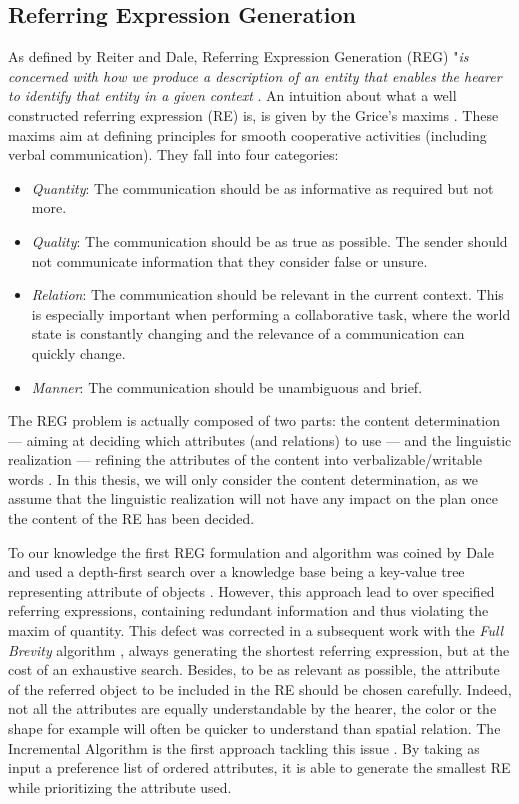 \documentclass[a4paper,11pt,twoside]{StyleThese}
\begin{document}
\subsection{Referring Expression Generation}
As defined by Reiter and Dale, Referring Expression Generation (REG) "\textit{is concerned with how we produce a description of an entity that enables the hearer to identify that entity in a given context} \cite{reiter1997building}. An intuition about what a well constructed referring expression (RE) is, is given by the Grice's maxims \cite{grice1975logic}. These maxims aim at defining principles for smooth cooperative activities (including verbal communication). They fall into four categories:
\begin{itemize}
\item \textit{Quantity}: The communication should be as informative as required but not more.
\item \textit{Quality}: The communication should be as true as possible. The sender should not communicate information that they consider false or unsure.
\item \textit{Relation}: The communication should be relevant in the current context. This is especially important when performing a collaborative task, where the world state is constantly changing and the relevance of a communication can quickly change.
\item \textit{Manner}: The communication should be unambiguous and brief.
\end{itemize}

The REG problem is actually composed of two parts: the content determination --- aiming at deciding which attributes (and relations) to use --- and the linguistic realization --- refining the attributes of the content into verbalizable/writable words \cite{krahmer2012computational}. In this thesis, we will only consider the content determination, as we assume that the linguistic realization will not have any impact on the plan once the content of the RE has been decided.

To our knowledge the first REG formulation and algorithm was coined by Dale and used a depth-first search over a knowledge base being a key-value tree representing attribute of objects \cite{dale1989cooking}. However, this approach lead to over specified referring expressions, containing redundant information and thus violating the maxim of quantity. This defect was corrected in a subsequent work with the \textit{Full Brevity} algorithm \cite{dale1992generating}, always generating the shortest referring expression, but at the cost of an exhaustive search. Besides, to be as relevant as possible, the attribute of the referred object to be included in the RE should be chosen carefully. Indeed, not all the attributes are equally understandable by the hearer, the color or the shape for example will often be quicker to understand than spatial relation. The Incremental Algorithm is the first approach tackling this issue \cite{dale1995computational}. By taking as input a preference list of ordered attributes, it is able to generate the smallest RE while prioritizing the attribute used.
\end{document}
